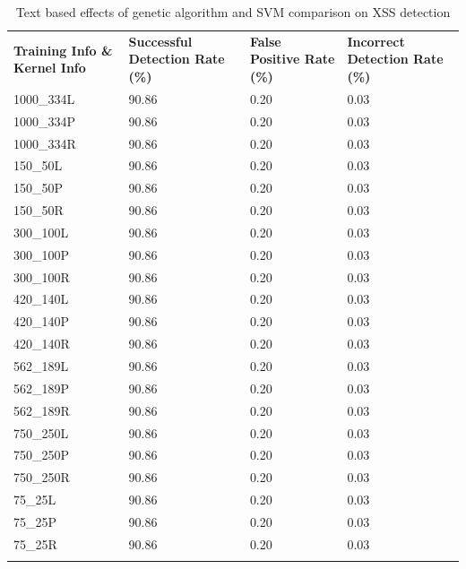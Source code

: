 \begin{appendices}
\begin{longtable}{|p{1.5in}|p{1in}|p{1in}|p{1in}|}
	\hline
	\textbf{Training Info \& Kernel Info} & \textbf{Successful Detection Rate (\%)} & \textbf{False Positive Rate (\%)} & \textbf{Incorrect Detection Rate (\%)}  \\
	\hhline{|=|=|=|=|}
	 1000\_334L & 90.86 & 0.20 & 0.03 \\ \hline
	 1000\_334P & 90.86 & 0.20 & 0.03 \\ \hline
	 1000\_334R & 90.86 & 0.20 & 0.03 \\ \hline
	   150\_50L & 90.86 & 0.20 & 0.03 \\ \hline
	   150\_50P & 90.86 & 0.20 & 0.03 \\ \hline
	   150\_50R & 90.86 & 0.20 & 0.03 \\ \hline
	  300\_100L & 90.86 & 0.20 & 0.03 \\ \hline
	  300\_100P & 90.86 & 0.20 & 0.03 \\ \hline
	  300\_100R & 90.86 & 0.20 & 0.03 \\ \hline
	  420\_140L & 90.86 & 0.20 & 0.03 \\ \hline
	  420\_140P & 90.86 & 0.20 & 0.03 \\ \hline
	  420\_140R & 90.86 & 0.20 & 0.03 \\ \hline
	  562\_189L & 90.86 & 0.20 & 0.03 \\ \hline
	  562\_189P & 90.86 & 0.20 & 0.03 \\ \hline
	  562\_189R & 90.86 & 0.20 & 0.03 \\ \hline
	  750\_250L & 90.86 & 0.20 & 0.03 \\ \hline
	  750\_250P & 90.86 & 0.20 & 0.03 \\ \hline
	  750\_250R & 90.86 & 0.20 & 0.03 \\ \hline
	    75\_25L & 90.86 & 0.20 & 0.03 \\ \hline
	    75\_25P & 90.86 & 0.20 & 0.03 \\ \hline
	    75\_25R & 90.86 & 0.20 & 0.03 \\ \hline
	\caption{Text based effects of genetic algorithm and SVM comparison on XSS detection}
\end{longtable}


\end{appendices}
